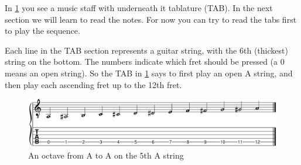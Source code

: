 
In \ref{fig:guitar_string_a_octave} you see a music staff with underneath it tablature (TAB). In the next section we will learn to read the notes. For now you can try to read the tabs first to play the sequence.

Each line in the TAB section represents a guitar string, with the 6th (thickest) string on the bottom. The numbers indicate which fret should be pressed (a 0 means an open string). So the TAB in \ref{fig:guitar_string_a_octave} says to first play an open A string, and then play each ascending fret up to the 12th fret.

\begin{figure}[h]
    \centering
    \includegraphics[width=\textwidth]{../../MuseScore/Guitar/PitchesSharps.png}
    \caption{An octave from A to A on the 5th A string}
    \label{fig:guitar_string_a_octave}
\end{figure}

